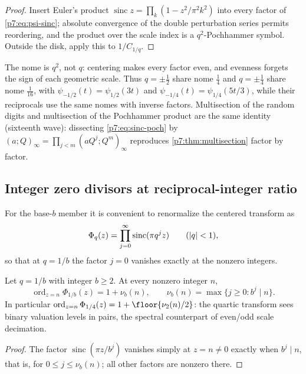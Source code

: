 \documentclass[11pt,oneside]{article}
\numberwithin{equation}{section}
\theoremstyle{definition}
\theoremstyle{remark}
\newcommand{\sinc}{\operatorname{sinc}}
\newcommand{\ord}{\operatorname{ord}}
\newcommand{\vtwo}{\nu_2}
\begin{document}
\begin{proof}
Insert Euler's product $\sinc z=\prod_k(1-z^2/\pi^2k^2)$ into every factor of
\eqref{p7:eq:psi-sinc}; absolute convergence of the double perturbation series
permits reordering, and the product over the scale index is a
$q^2$-Pochhammer symbol.  Outside the disk, apply this to $1/C_{1/q}$.
\end{proof}

The nome is $q^2$, not $q$: centering makes every factor even, and evenness
forgets the sign of each geometric scale.  Thus $q=\pm\tfrac12$ share nome
$\tfrac14$ and $q=\pm\tfrac14$ share nome $\tfrac1{16}$, with
$\psi_{-1/2}(t)=\psi_{1/2}(3t)$ and $\psi_{-1/4}(t)=\psi_{1/4}(5t/3)$, while
their reciprocals use the same nomes with inverse factors.  Multisection of
the random digits and multisection of the Pochhammer product are the same
identity (sixteenth wave): dissecting \eqref{p7:eq:sinc-poch} by
$(a;Q)_\infty=\prod_{j<m}(aQ^j;Q^m)_\infty$ reproduces
\cref{p7:thm:multisection} factor by factor.

\subsection{Integer zero divisors at reciprocal-integer ratio}

For the base-$b$ member it is convenient to renormalize the centered
transform as
\begin{equation}\label{p7:eq:Phi-q}
 \Phi_q(z)=\prod_{j=0}^{\infty}\sinc(\pi q^jz)
 \qquad(\abs q<1),
\end{equation}
so that at $q=1/b$ the factor $j=0$ vanishes exactly at the nonzero integers.

\begin{proposition}
\label{p7:prop:base-b-zero}
Let $q=1/b$ with integer $b\ge2$.  At every nonzero integer $n$,
\begin{equation}\label{p7:eq:base-b-zero}
 \ord_{z=n}\Phi_{1/b}(z)=1+\nu_b(n),
 \qquad
 \nu_b(n)=\max\{j\ge0:b^j\mid n\}.
\end{equation}
In particular $\ord_{z=n}\Phi_{1/4}(z)=1+\floor{\vtwo(n)/2}$: the quartic
transform sees binary valuation levels in pairs, the spectral counterpart of
even/odd scale decimation.
\end{proposition}

\begin{proof}
The factor $\sinc(\pi z/b^j)$ vanishes simply at $z=n\ne0$ exactly when
$b^j\mid n$, that is, for $0\le j\le\nu_b(n)$; all other factors are nonzero
there.
\end{proof}
\end{document}
